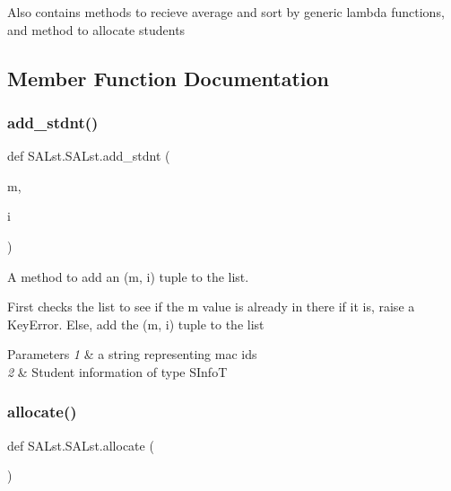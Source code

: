 Also contains methods to recieve average and sort by generic lambda functions, and method to allocate students 

\subsection{Member Function Documentation}
\mbox{\label{class_s_a_lst_1_1_s_a_lst_aa09d412a6f5562e32730d4857f7569ca}} 
\subsubsection{\texorpdfstring{add\+\_\+stdnt()}{add\_stdnt()}}
{\footnotesize\ttfamily def S\+A\+Lst.\+S\+A\+Lst.\+add\+\_\+stdnt (\begin{DoxyParamCaption}\item[{}]{m,  }\item[{}]{i }\end{DoxyParamCaption})\hspace{0.3cm}{\ttfamily [static]}}



A method to add an (m, i) tuple to the list. 

First checks the list to see if the m value is already in there if it is, raise a Key\+Error. Else, add the (m, i) tuple to the list 
\begin{DoxyParams}{Parameters}
{\em 1} & a string representing mac ids \\
\hline
{\em 2} & Student information of type S\+InfoT \\
\hline
\end{DoxyParams}
\mbox{\label{class_s_a_lst_1_1_s_a_lst_a8cdba5b89e936165b3628f52d4e80938}} 
\subsubsection{\texorpdfstring{allocate()}{allocate()}}
{\footnotesize\ttfamily def S\+A\+Lst.\+S\+A\+Lst.\+allocate (\begin{DoxyParamCaption}{ }\end{DoxyParamCaption})\hspace{0.3cm}{\ttfamily [static]}}



